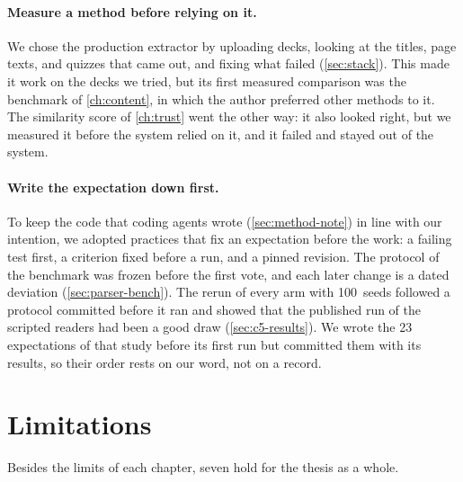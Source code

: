 \paragraph{Measure a method before relying on it.}
We chose the production extractor by uploading decks, looking at the titles,
page texts, and quizzes that came out, and fixing what failed
(\cref{sec:stack}). This made it work on the decks we tried, but its first
measured comparison was the benchmark of \cref{ch:content}, in which the
author preferred other methods to it. The similarity score of \cref{ch:trust}
went the other way: it also looked right, but we measured it before the system
relied on it, and it failed and stayed out of the system.

\paragraph{Write the expectation down first.}
To keep the code that coding agents wrote (\cref{sec:method-note}) in line
with our intention, we adopted practices that fix an expectation before the
work: a failing test first, a criterion fixed before a run, and a pinned
revision. The protocol of the benchmark was frozen before the first vote, and
each later change is a dated deviation (\cref{sec:parser-bench}). The rerun of every arm with 100~seeds followed a
protocol committed before it ran and showed that the published run of the
scripted readers had been a good draw (\cref{sec:c5-results}). We wrote the
23 expectations of that study before its first run but committed them with
its results, so their order rests on our word, not on a record.

\section{Limitations}
\label{sec:limitations}

Besides the limits of each chapter, seven hold for the thesis as a whole.

